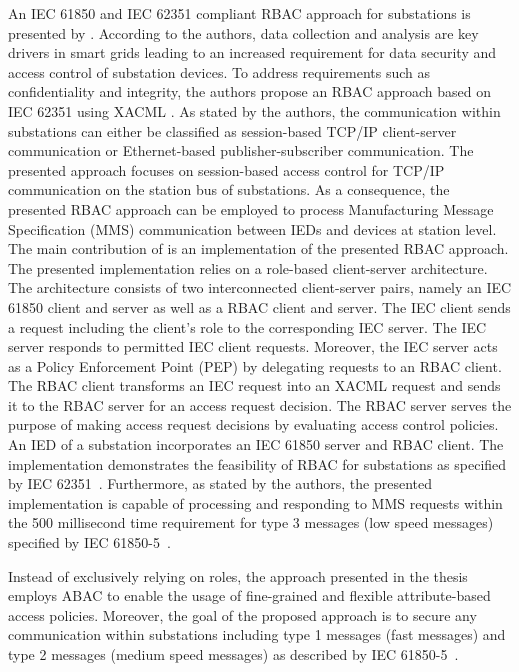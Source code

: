 An IEC 61850 and IEC 62351 compliant RBAC approach for substations is presented by \citeauthor{Lee2015} \cite{Lee2015}.
According to the authors, data collection and analysis are key drivers in smart grids leading to an increased requirement for data security and access control of substation devices.
To address requirements such as confidentiality and integrity, the authors propose an RBAC approach based on IEC 62351 \cite{IEC62351P8} using XACML \cite{Oasis2013}.
As stated by the authors, the communication within substations can either be classified as session-based TCP/IP client-server communication or Ethernet-based publisher-subscriber communication.
The presented approach focuses on session-based access control for TCP/IP communication on the station bus of substations.
As a consequence, the presented RBAC approach can be employed to process Manufacturing Message Specification (MMS) communication between IEDs and devices at station level.
The main contribution of \citeauthor{Lee2015} is an implementation of the presented RBAC approach.
The presented implementation relies on a role-based client-server architecture.
The architecture consists of two interconnected client-server pairs, namely an IEC 61850 client and server as well as a RBAC client and server.
The IEC client sends a request including the client's role to the corresponding IEC server.
The IEC server responds to permitted IEC client requests.
Moreover, the IEC server acts as a Policy Enforcement Point (PEP) by delegating requests to an RBAC client.
The RBAC client transforms an IEC request into an XACML request and sends it to the RBAC server for an access request decision.
The RBAC server serves the purpose of making access request decisions by evaluating access control policies.
An IED of a substation incorporates an IEC 61850 server and RBAC client.
The implementation demonstrates the feasibility of RBAC for substations as specified by IEC 62351~\cite{IEC62351P8}.
Furthermore, as stated by the authors, the presented implementation is capable of processing and responding to MMS requests within the 500 millisecond time requirement for type 3 messages (low speed messages) specified by IEC 61850-5~\cite{IEC61850P5}.

Instead of exclusively relying on roles, the approach presented in the thesis employs ABAC to enable the usage of fine-grained and flexible attribute-based access policies.
Moreover, the goal of the proposed approach is to secure any communication within substations including type 1 messages (fast messages) and type 2 messages (medium speed messages) as described by IEC 61850-5~\cite{IEC61850P5}.

